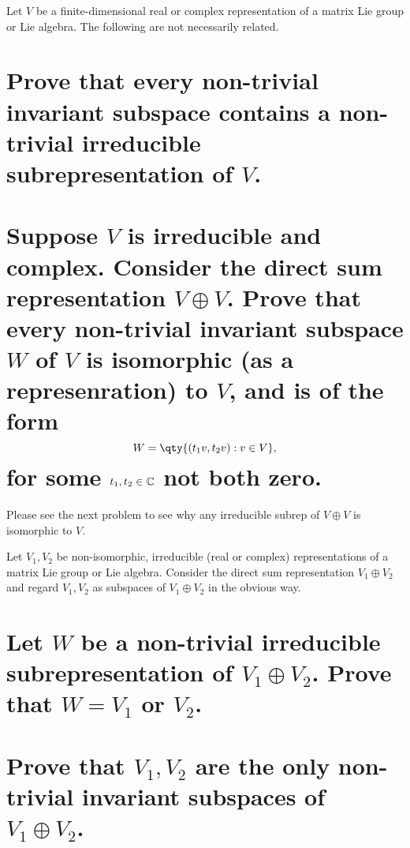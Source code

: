\documentclass[
	pages,
	boxes,
	color=WildStrawberry
]{homework}
\begin{document}
\begin{problem}
Let $V$ be a finite-dimensional real or complex representation of a matrix Lie group or Lie algebra. The following are not necessarily related.
\begin{parts}
	\part{Prove that every non-trivial invariant subspace contains a non-trivial irreducible subrepresentation of $V$.}\label{part:5a}
	\part{Suppose $V$ is irreducible and complex. Consider the direct sum representation $V \oplus V$. Prove that every non-trivial invariant subspace $W$ of $V$ is isomorphic (as a represenration) to $V$, and is of the form
		\[
			W = \qty{(t_1v, t_2v) : v \in V},
		\]
		for some $t_1, t_2 \in \mathbb{C}$ not both zero.}\label{part:5b}
\end{parts}
\end{problem}

\begin{solution}
	\ref{part:5a}
	\ref{part:5b}
	Please see the next problem to see why any irreducible subrep of $V\oplus V$ is isomorphic to $V$.
\end{solution}

\begin{problem}
Let $V_1, V_2$ be non-isomorphic, irreducible (real or complex) representations of a matrix Lie group or Lie algebra. Consider the direct sum representation $V_1 \oplus V_2$ and regard $V_1, V_2$ as subspaces of $V_1 \oplus V_2$ in the obvious way.
\begin{parts}
	\part{Let $W$ be a non-trivial irreducible subrepresentation of $V_1 \oplus V_2$. Prove that $W = V_1$ or $V_2$.}
	\part{Prove that $V_1, V_2$ are the only non-trivial invariant subspaces of $V_1 \oplus V_2$.}
\end{parts}
\end{problem}
\end{document}
